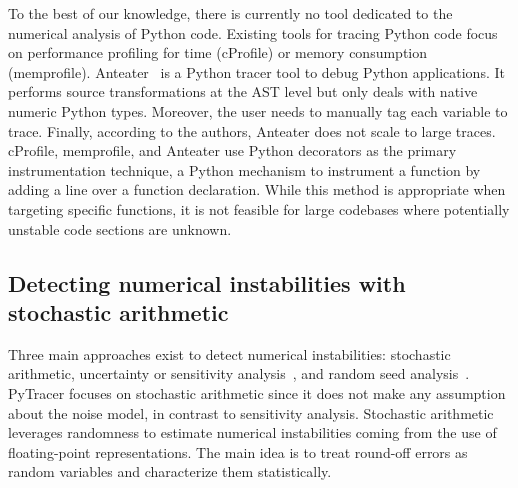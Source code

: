 \documentclass[11pt]{article}
\newcommand{\tristan}[1]{\color{orange}\textbf{From Tristan:} #1\color{black}\xspace}
\newcommand{\pytracer}[0]{PyTracer\xspace}
\begin{document}
To the best of our knowledge, there is currently no tool dedicated to the numerical analysis of Python code. Existing tools for tracing Python code focus on  performance profiling for time (cProfile) 
or memory consumption (memprofile). 
Anteater~\cite{faust2019anteater} is a Python tracer tool to debug Python applications. 
It performs source transformations at the AST level but only deals with native numeric Python types.
Moreover, the user needs to manually tag each variable to trace. Finally, according to the authors, Anteater does not scale to large traces.
cProfile, memprofile, and Anteater use Python decorators as the primary instrumentation technique, a Python mechanism to instrument a function by adding a line over a function declaration.
While this method is appropriate when targeting specific functions, it is not feasible for large codebases where potentially unstable code sections are unknown.


\label{sec:detecting-instabilities}
\subsection{Detecting numerical instabilities with stochastic arithmetic}
\label{sec:mca}

 




Three main approaches exist to detect numerical instabilities: stochastic arithmetic, uncertainty or sensitivity analysis~\cite{helton2006survey}, and random seed analysis~\cite{click2011quality}.
\pytracer focuses on stochastic arithmetic since it does not make any assumption about 
the noise model, in contrast to sensitivity analysis.
Stochastic arithmetic leverages randomness to estimate numerical instabilities coming from the use of floating-point representations. The main idea is to treat round-off errors 
as random variables and characterize them statistically.
\end{document}
